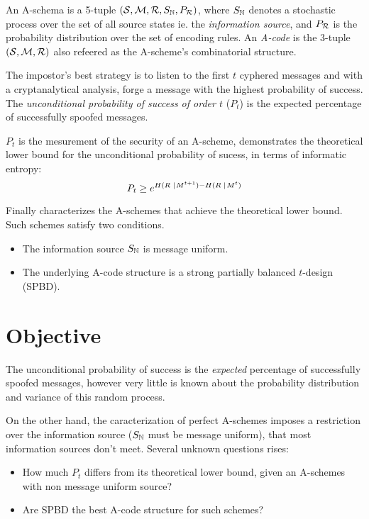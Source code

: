 \documentclass[conference]{IEEEtran}
\begin{document}
An A-schema is a 5-tuple $\left( \mathcal S,\mathcal M,\mathcal R,S_\mathbb{N}, P_\mathcal R \right)$, where $S_\mathbb{N}$ denotes a stochastic process over the set of all source states ie. the \textit{information source}, and $P_\mathcal R$ is the probability distribution over the set of encoding rules. An \textit{A-code} is the 3-tuple $\left( \mathcal S,\mathcal M,\mathcal R\right)$ also refeered as the A-scheme's combinatorial structure.

The impostor's best strategy is to listen to the first $t$ cyphered messages and with a cryptanalytical analysis, forge a message with the highest probability of success. The \textit{unconditional probability of success of order $t$} ($P_t$) is the expected percentage of successfully spoofed messages.

$P_t$ is the mesurement of the security of an A-scheme, \cite{b3} demonstrates the theoretical lower bound for the unconditional probability of sucess, in terms of informatic entropy:
\[
    P_t \geq
    e^{
    H(R\;\; \hspace{-0.2em} \mid \hspace{-0.15em} \;M^{t+1})
    - H(R\;\; \hspace{-0.2em} \mid \hspace{-0.15em} \;M^{t})
    }
\]

Finally \cite{b4} characterizes the A-schemes that achieve the theoretical lower bound. Such schemes satisfy two conditions.
\begin{itemize}
    \item The information source $S_\mathbb{N}$ is message uniform.
    \item The underlying A-code structure is a strong partially balanced $t$-design (SPBD).
\end{itemize}

%
%
\section{Objective}
The unconditional probability of success is the \textit{expected} percentage of successfully spoofed messages, however very little is known about the probability distribution and variance of this random process.

On the other hand, the caracterization of perfect A-schemes imposes a restriction over the information source ($S_\mathbb{N}$ must be message uniform), that most information sources don't meet. Several unknown questions rises:
\begin{itemize}
    \item How much $P_t$ differs from its theoretical lower bound, given an A-schemes with non message uniform source?
    \item Are SPBD the best A-code structure for such schemes?
\end{itemize}
\end{document}
